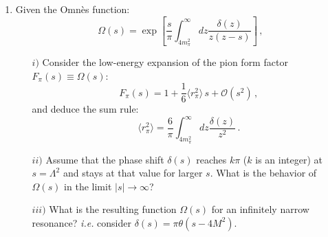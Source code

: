 
\begin{enumerate}

\item Given the Omn\`{e}s function:
\begin{equation}
\Omega(s)=\exp\left[\frac{s}{\pi}\int_{4m_{\pi}^{2}}^{\infty}dz\frac{\delta(z)}{z(z-s)}\right]\,,
\label{Eq:Omnes}
\end{equation}

\begin{itemize}
\item[$i)$] Consider the low-energy expansion of the pion form factor $F_{\pi}(s)\equiv\Omega(s)$:
\begin{equation}
F_{\pi}(s)=1+\frac{1}{6}\langle r^{2}_{\pi}\rangle\,s+\mathcal{O}(s^{2})\,,
\end{equation}
and deduce the sum rule:
\begin{equation}
\langle r^{2}_{\pi}\rangle=\frac{6}{\pi}\int_{4m_{\pi}^{2}}^{\infty}dz\frac{\delta(z)}{z^{2}}\,.
\end{equation}
\item[$ii)$] Assume that the phase shift $\delta(s)$ reaches $k\pi$ ($k$ is an integer) at $s=\Lambda^{2}$ and stays at that value for larger $s$. What is the behavior of $\Omega(s)$ in the limit $|s|\to\infty$?\\
\item[$iii)$] What is the resulting function $\Omega(s)$ for an infinitely narrow resonance? {\it{i.e.}} consider $\delta(s)=\pi\theta(s-4M^{2})$.
\end{itemize}


\end{enumerate}


